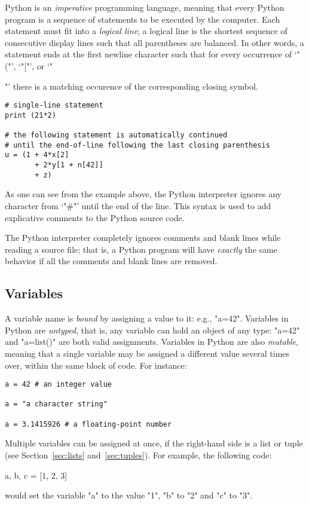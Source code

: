 Python is an \emph{imperative} programming language, meaning that
every Python program is a sequence of statements to be executed by the
computer.  Each statement must fit into a \emph{logical line}; a
logical line is the shortest sequence of consecutive display lines
such that all parentheses are balanced.  In other words, a statement
ends at the first newline character such that for every occurrence of
`"("', `"["', or `"{"' there is a matching occurence of the
corresponding closing symbol.
\begin{lstlisting}
# single-line statement
print (21*2)

# the following statement is automatically continued
# until the end-of-line following the last closing parenthesis
u = (1 + 4*x[2] 
       + 2*y[1 + n[42]]
       + z)
\end{lstlisting}
As one can see from the example above, the Python interpreter ignores
any character from `"#"' until the end of the line.  This
syntax is used to add explicative comments to the Python source code.

The Python interpreter completely ignores comments and blank lines
while reading a source file; that is, a Python program will have
\emph{exactly} the same behavior if all the comments and blank lines
are removed.

\subsection{Variables}
\label{sec:variables}

A variable name is \emph{bound} by assigning a value to it: e.g.,
"a=42".  Variables in Python are \emph{untyped}, that is, any
variable can hold an object of any type: "a=42" and "a=list()"
are both valid assignments. Variables in Python are also
\emph{mutable}, meaning that a single variable may be assigned a
different value several times over, within the same block of code.
For instance:
\begin{lstlisting}
a = 42 # an integer value

a = "a character string"

a = 3.1415926 # a floating-point number
\end{lstlisting}

Multiple variables can be assigned at once, if the right-hand side is
a list or tuple (see Section~\ref{sec:lists} and~\ref{sec:tuples}). For
example, the following code:
\begin{codexmp}
  a, b, c = [1, 2, 3]
\end{codexmp}
would set the variable "a" to the value "1", "b" to "2" and "c" to
"3".

}
